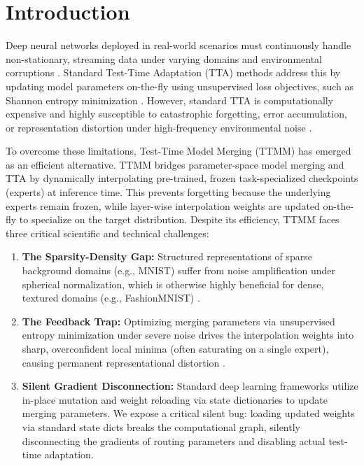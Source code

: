 \documentclass{article}
\theoremstyle{plain}
\theoremstyle{definition}
\theoremstyle{remark}
\begin{document}
\section{Introduction}
\label{sec:intro}
Deep neural networks deployed in real-world scenarios must continuously handle non-stationary, streaming data under varying domains and environmental corruptions \cite{hendrycks2019robustness, wang2021tent}. Standard Test-Time Adaptation (TTA) methods address this by updating model parameters on-the-fly using unsupervised loss objectives, such as Shannon entropy minimization \cite{wang2021tent, boudiaf2022parameter}. However, standard TTA is computationally expensive and highly susceptible to catastrophic forgetting, error accumulation, or representation distortion under high-frequency environmental noise \cite{wang2022cotta, niu2022rotta}.

To overcome these limitations, Test-Time Model Merging (TTMM) \cite{bk_comerge, cp_am} has emerged as an efficient alternative. TTMM bridges parameter-space model merging \cite{wortsman2022robust, yadav2023ties, matena2022merging} and TTA by dynamically interpolating pre-trained, frozen task-specialized checkpoints (experts) at inference time. This prevents forgetting because the underlying experts remain frozen, while layer-wise interpolation weights are updated on-the-fly to specialize on the target distribution. Despite its efficiency, TTMM faces three critical scientific and technical challenges:
\begin{enumerate}
    \item \textbf{The Sparsity-Density Gap:} Structured representations of sparse background domains (e.g., MNIST) suffer from noise amplification under spherical normalization, which is otherwise highly beneficial for dense, textured domains (e.g., FashionMNIST) \cite{cp_am}.
    \item \textbf{The Feedback Trap:} Optimizing merging parameters via unsupervised entropy minimization under severe noise drives the interpolation weights into sharp, overconfident local minima (often saturating on a single expert), causing permanent representational distortion \cite{bk_comerge}.
    \item \textbf{Silent Gradient Disconnection:} Standard deep learning frameworks utilize in-place mutation and weight reloading via state dictionaries to update merging parameters. We expose a critical silent bug: loading updated weights via standard state dicts breaks the computational graph, silently disconnecting the gradients of routing parameters and disabling actual test-time adaptation.
\end{enumerate}
\end{document}
